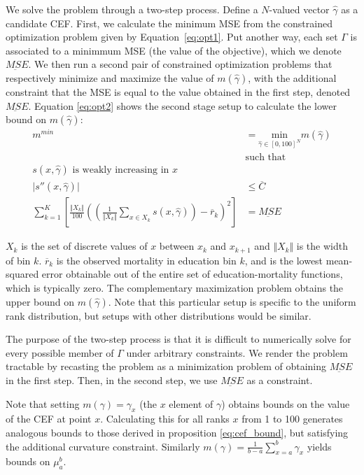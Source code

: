 We solve the problem through a two-step process. Define a $N$-valued
vector $\hat{\gamma}$ as a candidate CEF. First, we calculate the
minimum MSE from the constrained optimization problem given by
Equation~\ref{eq:opt1}. Put another way, each set $\Gamma$
  is associated to a minimmum MSE (the value of the objective), which
  we denote $\underbar{MSE}$. We then run a second pair of constrained optimization problems that respectively minimize and maximize the value of $m(\hat{\gamma})$, with the additional constraint that the MSE is equal to the value obtained in the first step, denoted $\underbar{MSE}$. Equation \ref{eq:opt2} shows the second stage setup to calculate the lower bound on $m(\hat{\gamma})$:
\begin{align}
  \label{eq:opt2}
  m^{min} &= \underset{ \hat{\gamma} \in [0,100]^{N} }{ \text{min} } m(\hat{\gamma}) \\
  &\nonumber \text{such that} \\
  \tag{Monotonicity} s(x, \hat{\gamma}) \text{ is weakly increasing in } x \\
  \tag{Curvature} \lvert s''(x, \hat{\gamma}) \rvert &\leq \overline{C} \\
  \tag{MSE Minimization} \sum_{k=1}^K \left[ \frac{\Vert X_k \Vert}{100} \left( \left( \frac{1}{\Vert X_k \Vert} \sum_{x \in X_k} s(x,\hat{\gamma}) \right) - \overline{r}_k \right)^2 \right] &= \underbar{MSE}
\end{align}

\noindent
$X_k$ is the set of discrete values of $x$ between $x_{k}$ and
$x_{k+1}$ and $\Vert X_k \Vert$ is the width of bin
$k$. $\overline{r}_k$ is the observed mortality in education bin $k$,
and  is the lowest mean-squared error obtainable out of
the entire set of education-mortality functions, which is typically
zero. The complementary maximization problem obtains the upper bound
on $m(\hat{\gamma})$. Note that this particular setup is specific to
the uniform rank distribution, but setups with other distributions
would be similar. 

The purpose of the two-step process is that it is difficult to
numerically solve for every possible member of $\Gamma$ under
arbitrary constraints. We render the problem tractable by recasting
the problem as a minimization problem of obtaining $\underbar{MSE}$ in
the first step. Then, in the second step, we use $\underbar{MSE}$ as a
constraint. 

Note that setting $m(\gamma) = \gamma_x$ (the $x$ element of $\gamma$) obtains bounds on the value of the CEF at point $x$. Calculating this for all ranks $x$ from 1 to 100 generates analogous bounds to those derived in proposition \ref{eq:cef_bound}, but satisfying the additional curvature constraint. Similarly $m(\gamma) = \frac{1}{b-a} \sum_{x=a}^{b}\gamma_x$ yields bounds on $\mu_a^b$.

